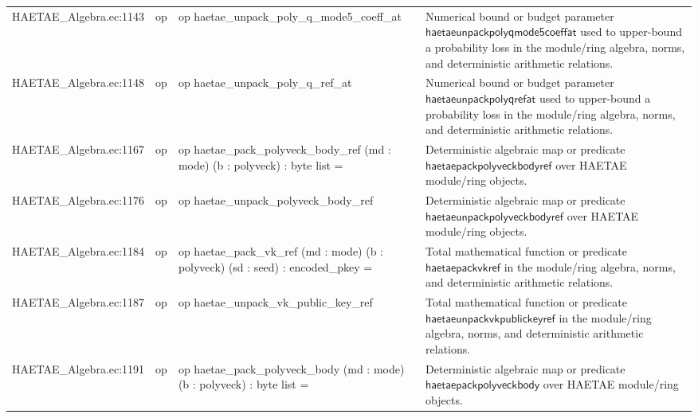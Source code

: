 \documentclass[10pt]{article}
\begin{document}
\begin{longtable}{L{0.11\textwidth}L{0.055\textwidth}L{0.385\textwidth}L{0.41\textwidth}}
HAETAE\_\allowbreak{}Algebra.\allowbreak{}ec:\allowbreak{}1143 & op & {\ttfamily\scriptsize op haetae\_\allowbreak{}unpack\_\allowbreak{}poly\_\allowbreak{}q\_\allowbreak{}mode5\_\allowbreak{}coeff\_\allowbreak{}at} & Numerical bound or budget parameter $\mathsf{haetaeunpackpolyqmode5coeffat}$ used to upper-bound a probability loss in the module/ring algebra, norms, and deterministic arithmetic relations. \\
HAETAE\_\allowbreak{}Algebra.\allowbreak{}ec:\allowbreak{}1148 & op & {\ttfamily\scriptsize op haetae\_\allowbreak{}unpack\_\allowbreak{}poly\_\allowbreak{}q\_\allowbreak{}ref\_\allowbreak{}at} & Numerical bound or budget parameter $\mathsf{haetaeunpackpolyqrefat}$ used to upper-bound a probability loss in the module/ring algebra, norms, and deterministic arithmetic relations. \\
HAETAE\_\allowbreak{}Algebra.\allowbreak{}ec:\allowbreak{}1167 & op & {\ttfamily\scriptsize op haetae\_\allowbreak{}pack\_\allowbreak{}polyveck\_\allowbreak{}body\_\allowbreak{}ref (md : mode) (b : polyveck) : byte list =} & Deterministic algebraic map or predicate $\mathsf{haetaepackpolyveckbodyref}$ over HAETAE module/ring objects. \\
HAETAE\_\allowbreak{}Algebra.\allowbreak{}ec:\allowbreak{}1176 & op & {\ttfamily\scriptsize op haetae\_\allowbreak{}unpack\_\allowbreak{}polyveck\_\allowbreak{}body\_\allowbreak{}ref} & Deterministic algebraic map or predicate $\mathsf{haetaeunpackpolyveckbodyref}$ over HAETAE module/ring objects. \\
HAETAE\_\allowbreak{}Algebra.\allowbreak{}ec:\allowbreak{}1184 & op & {\ttfamily\scriptsize op haetae\_\allowbreak{}pack\_\allowbreak{}vk\_\allowbreak{}ref (md : mode) (b : polyveck) (sd : seed) : encoded\_\allowbreak{}pkey =} & Total mathematical function or predicate $\mathsf{haetaepackvkref}$ in the module/ring algebra, norms, and deterministic arithmetic relations. \\
HAETAE\_\allowbreak{}Algebra.\allowbreak{}ec:\allowbreak{}1187 & op & {\ttfamily\scriptsize op haetae\_\allowbreak{}unpack\_\allowbreak{}vk\_\allowbreak{}public\_\allowbreak{}key\_\allowbreak{}ref} & Total mathematical function or predicate $\mathsf{haetaeunpackvkpublickeyref}$ in the module/ring algebra, norms, and deterministic arithmetic relations. \\
HAETAE\_\allowbreak{}Algebra.\allowbreak{}ec:\allowbreak{}1191 & op & {\ttfamily\scriptsize op haetae\_\allowbreak{}pack\_\allowbreak{}polyveck\_\allowbreak{}body (md : mode) (b : polyveck) : byte list =} & Deterministic algebraic map or predicate $\mathsf{haetaepackpolyveckbody}$ over HAETAE module/ring objects. \\

\end{longtable}
\end{document}
